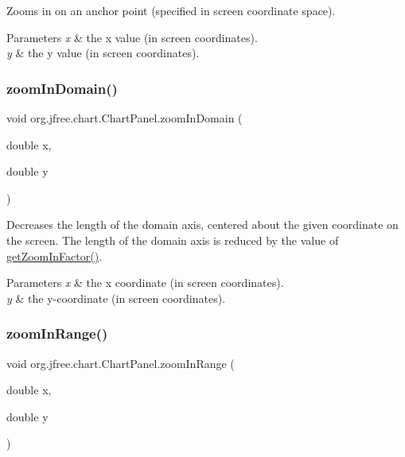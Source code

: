 Zooms in on an anchor point (specified in screen coordinate space).


\begin{DoxyParams}{Parameters}
{\em x} & the x value (in screen coordinates). \\
\hline
{\em y} & the y value (in screen coordinates). \\
\hline
\end{DoxyParams}
\mbox{\label{classorg_1_1jfree_1_1chart_1_1_chart_panel_aac0b052931bf20e0ea076b9faec0a94e}} 
\subsubsection{\texorpdfstring{zoom\+In\+Domain()}{zoomInDomain()}}
{\footnotesize\ttfamily void org.\+jfree.\+chart.\+Chart\+Panel.\+zoom\+In\+Domain (\begin{DoxyParamCaption}\item[{double}]{x,  }\item[{double}]{y }\end{DoxyParamCaption})}

Decreases the length of the domain axis, centered about the given coordinate on the screen. The length of the domain axis is reduced by the value of \mbox{\hyperlink{classorg_1_1jfree_1_1chart_1_1_chart_panel_a43dfc4192b55821224ea51b414f7494c}{get\+Zoom\+In\+Factor()}}.


\begin{DoxyParams}{Parameters}
{\em x} & the x coordinate (in screen coordinates). \\
\hline
{\em y} & the y-\/coordinate (in screen coordinates). \\
\hline
\end{DoxyParams}
\mbox{\label{classorg_1_1jfree_1_1chart_1_1_chart_panel_a98f40cb1439bcc2669f4dfb1ecb62c5d}} 
\subsubsection{\texorpdfstring{zoom\+In\+Range()}{zoomInRange()}}
{\footnotesize\ttfamily void org.\+jfree.\+chart.\+Chart\+Panel.\+zoom\+In\+Range (\begin{DoxyParamCaption}\item[{double}]{x,  }\item[{double}]{y }\end{DoxyParamCaption})}

